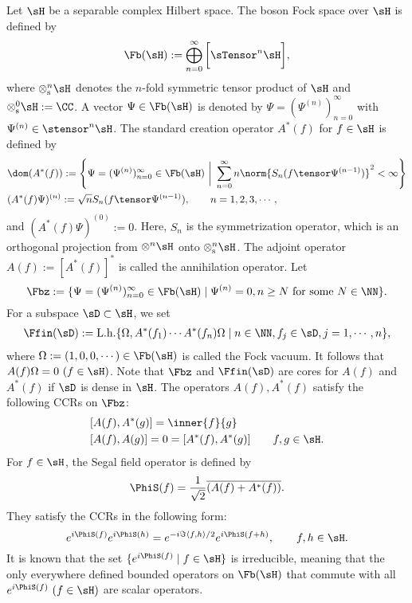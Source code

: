 \documentclass[12pt]{article}
\theoremstyle{plain}
\numberwithin{equation}{section}
\theoremstyle{remark}
\begin{document}
Let $\sH$ be a separable complex Hilbert space. The boson Fock space over $\sH$ is defined by
\begin{align*}
  \Fb(\sH) := \bigoplus_{n=0}^\infty \bigg[ \sTensor^n \sH \bigg],
\end{align*}
where $\otimes_{\rm s}^n \sH$ denotes the $n$-fold symmetric tensor product of $\sH$ and $\otimes_{\rm s}^0 \sH:=\CC$.
A vector $\Psi \in \Fb(\sH)$ is denoted by $\Psi = (\Psi^{(n)})_{n=0}^\infty$ with 
$\Psi^{(n)}\in \stensor^n \sH$.
The standard creation operator $A^*(f)$ for $f\in\sH$ is defined by
\begin{align*}
& \dom(A^*(f)) := \left\{\Psi=(\Psi^{(n)})_{n=0}^\infty \in \Fb(\sH) ~\bigg|~ \sum_{n=0}^\infty n\norm{S_n(f\tensor\Psi^{(n-1)})}^2<\infty\right\} \\
& (A^*(f)\Psi)^{(n)} := \sqrt{n}S_n(f\tensor \Psi^{(n-1)}), \qquad n=1,2,3,\cdots,
\end{align*}
and $(A^*(f)\Psi)^{(0)}:=0$.
Here, $S_n$ is the symmetrization operator, which is an orthogonal projection from $\otimes^n \sH$ onto $\otimes_{\rm s}^n \sH$.
The adjoint operator $A(f) := [A^*(f)]^*$ is called the annihilation operator.
Let
\[
\Fbz := \{ \Psi=(\Psi^{(n)})_{n=0}^\infty \in \Fb(\sH) \mid \Psi^{(n)} = 0, n\geq N \text{ for some } N\in\NN \}.
\]
For a subspace $\sD \subset \sH$, we set 
\begin{align*}
 \Ffin(\sD) := \mathrm{L.h.}\{\Omega, A^*(f_1)\cdots A^*(f_n)\Omega \mid n\in\NN, f_j\in\sD, j=1,\cdots,n \},
\end{align*}
where $\Omega:=(1,0,0,\cdots)\in\Fb(\sH)$ is called the Fock vacuum.
It follows that $A(f)\Omega = 0 ~ (f\in\sH)$.
Note that $\Fbz$ and $\Ffin(\sD)$ are cores for $A(f)$ and $A^*(f)$ if $\sD$ is dense in $\sH$.
The operators $A(f), A^*(f)$ satisfy the following CCRs on $\Fbz$:
\begin{align*}
  & [A(f),A^*(g)] = \inner{f}{g} \\
  & [A(f),A(g)] = 0 = [A^*(f), A^*(g)]  ~~~~~~   f,g\in\sH.
\end{align*}
For $f\in\sH$, the Segal field operator is defined by
\begin{align*}
  \PhiS(f) = \frac{1}{\sqrt{2}} \overline{(A(f)+A^*(f))}.
\end{align*}
They satisfy the CCRs in the following form:
\[
 e^{i\PhiS(f)}e^{i\PhiS(h)} = e^{-i \Im\langle f,h\rangle /2}e^{i\PhiS(f+h)},
 \qquad f,h\in\sH.
\]
It is known that the set $\{e^{i\PhiS(f)} \mid f\in\sH\}$ is irreducible, 
meaning that the only everywhere defined bounded operators on $\Fb(\sH)$ 
that commute with all $e^{i\PhiS(f)} ~ (f\in\sH)$ are scalar operators. 
\end{document}
